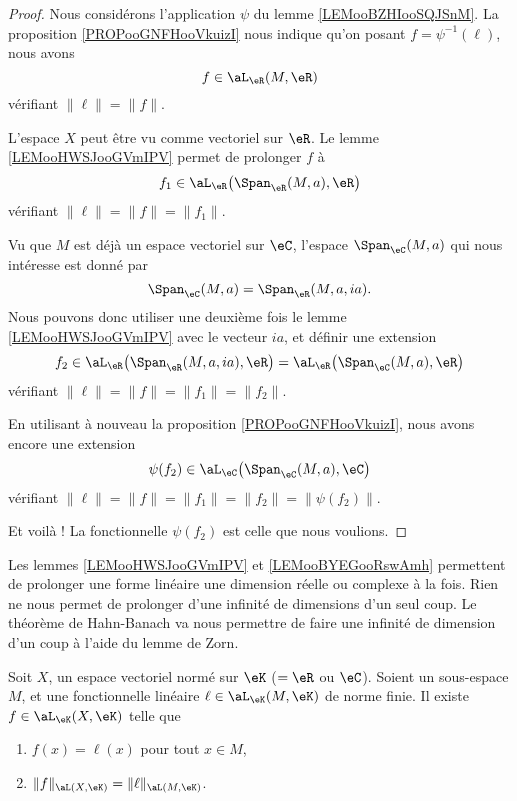 	\begin{proof}
		Nous considérons l'application \( \psi\) du lemme \ref{LEMooBZHIooSQJSnM}. La proposition \ref{PROPooGNFHooVkuizI} nous indique qu'on posant \( f=\psi^{-1}(\ell)\), nous avons
		\begin{equation}
			f\in\aL_{\eR}(M,\eR)
		\end{equation}
		vérifiant \( \| \ell \|=\| f \|\).

		L'espace \( X\) peut être vu comme vectoriel sur \( \eR\). Le lemme \ref{LEMooHWSJooGVmIPV} permet de prolonger \( f\) à
		\begin{equation}
			f_1\in\aL_{\eR}\big( \Span_{\eR}(M,a),\eR \big)
		\end{equation}
		vérifiant \( \| \ell \|=\| f \|=\| f_1 \|\).

		Vu que \( M\) est déjà un espace vectoriel sur \( \eC\), l'espace \( \Span_{\eC}(M,a)\) qui nous intéresse est donné par
		\begin{equation}
			\Span_{\eC}(M,a)=\Span_{\eR}(M,a,ia).
		\end{equation}
		Nous pouvons donc utiliser une deuxième fois le lemme \ref{LEMooHWSJooGVmIPV} avec le vecteur \( ia\), et définir une extension
		\begin{equation}
			f_2\in\aL_{\eR}\big( \Span_{\eR}(M,a,ia),\eR \big)=\aL_{\eR}\big( \Span_{\eC}(M,a),\eR \big)
		\end{equation}
		vérifiant \( \| \ell \|=\| f \|=\| f_1 \|=\| f_2 \|\).

		En utilisant à nouveau la proposition \ref{PROPooGNFHooVkuizI}, nous avons encore une extension
		\begin{equation}
			\psi(f_2)\in\aL_{\eC}\big( \Span_{\eC}(M,a),\eC \big)
		\end{equation}
		vérifiant \( \| \ell \|=\| f \|=\| f_1 \|=\| f_2 \|=\| \psi(f_2) \|\).

		Et voilà ! La fonctionnelle \( \psi(f_2)\) est celle que nous voulions.
	\end{proof}

	Les lemmes \ref{LEMooHWSJooGVmIPV} et \ref{LEMooBYEGooRswAmh} permettent de prolonger une forme linéaire une dimension réelle ou complexe à la fois. Rien ne nous permet de prolonger d'une infinité de dimensions d'un seul coup. Le théorème de Hahn-Banach va nous permettre de faire une infinité de dimension d'un coup à l'aide du lemme de Zorn.

	\begin{theorem}        \label{THOooTZSSooBKfxXE}
		Soit \( X\), un espace vectoriel normé sur \( \eK\) (\(=\eR\) ou \( \eC\)). Soient un sous-espace \( M\), et une fonctionnelle linéaire \( \ell\in\aL_{\eK}(M,\eK)\) de norme finie. Il existe \( f\in\aL_{\eK}(X,\eK)\) telle que
		\begin{enumerate}
			\item
			      \( f(x)=\ell(x)\) pour tout \( x\in M\),
			\item
			      \( \| f \|_{\aL(X,\eK)}=\| \ell \|_{\aL(M,\eK)}\).
		\end{enumerate}
	\end{theorem}


